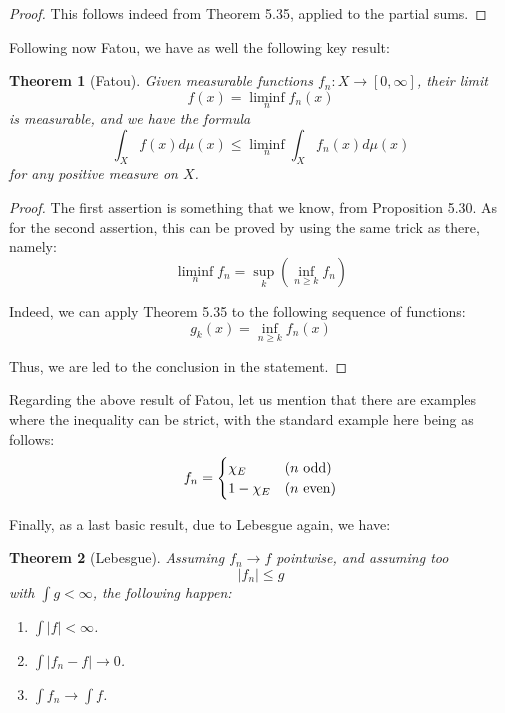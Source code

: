\documentclass[12pt]{amsbook}
\newtheorem{theorem}{Theorem}[chapter]
\begin{document}
\begin{proof}
This follows indeed from Theorem 5.35, applied to the partial sums.
\end{proof}

Following now Fatou, we have as well the following key result:

\begin{theorem}[Fatou]
Given measurable functions $f_n:X\to[0,\infty]$, their limit 
$$f(x)=\liminf_nf_n(x)$$
is measurable, and we have the formula
$$\int_Xf(x)d\mu(x)\leq\liminf_n\int_Xf_n(x)d\mu(x)$$
for any positive measure on $X$.
\end{theorem}

\begin{proof}
The first assertion is something that we know, from Proposition 5.30. As for the second assertion, this can be proved by using the same trick as there, namely: 
$$\liminf_nf_n=\sup_k\left(\inf_{n\geq k}f_n\right)$$

Indeed, we can apply Theorem 5.35 to the following sequence of functions:
$$g_k(x)=\inf_{n\geq k}f_n(x)$$

Thus, we are led to the conclusion in the statement.
\end{proof}

Regarding the above result of Fatou, let us mention that there are examples where the inequality can be strict, with the standard example here being as follows:
$$f_n=\begin{cases}
\chi_E&(n\ {\rm odd})\\
1-\chi_E&(n\ {\rm even})
\end{cases}$$

Finally, as a last basic result, due to Lebesgue again, we have:

\begin{theorem}[Lebesgue]
Assuming $f_n\to f$ pointwise, and assuming too 
$$|f_n|\leq g$$
with $\int g<\infty$, the following happen:
\begin{enumerate}
\item $\int|f|<\infty$.

\item $\int|f_n-f|\to0$.

\item $\int f_n\to\int f$.
\end{enumerate}
\end{theorem}
\end{document}
